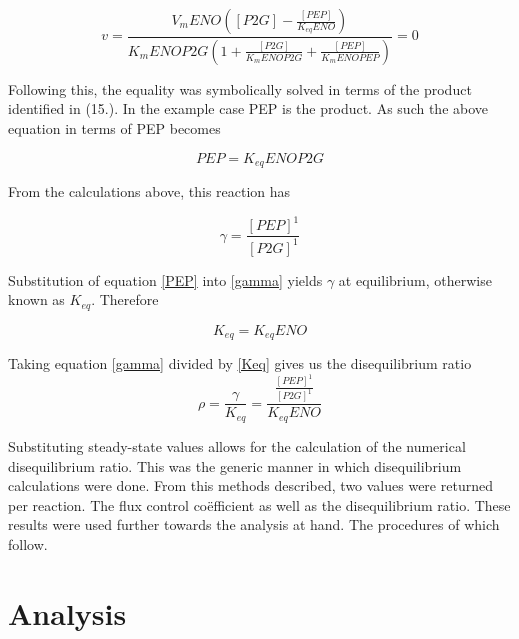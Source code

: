 \begin{equation}
v = \frac{V_mENO([P2G] - \frac{[PEP]}{K_{eq}ENO})}{K_mENOP2G(1 + \frac{[P2G]}{K_mENOP2G} + \frac{[PEP]}{K_mENOPEP})} = 0
\end{equation}

Following this, the equality was symbolically solved in terms of the product identified in (15.). In the example case PEP is the product. As such the above equation in terms of PEP becomes

\begin{equation}\label{PEP}
PEP = K_{eq}ENOP2G
\end{equation}

From the calculations above, this reaction has

\begin{equation}\label{gamma}
\gamma=\frac{[PEP]^1}{[P2G]^1}
\end{equation}

Substitution of equation \ref{PEP} into \ref{gamma} yields $\gamma$ at equilibrium, otherwise known as $K_{eq}$. Therefore

\begin{equation}\label{Keq}
K_{eq}=K_{eq}ENO
\end{equation}

Taking equation \ref{gamma} divided by \ref{Keq} gives us the disequilibrium ratio
\begin{equation}
\rho = \frac{\gamma}{K_{eq}} = \frac{\frac{[PEP]^1}{[P2G]^1}}{K_{eq}ENO}
\end{equation}

Substituting steady-state values allows for the calculation of the numerical disequilibrium ratio. This was the generic manner in which disequilibrium calculations were done. From this methods described, two values were returned per reaction. The flux control co\"efficient as well as the disequilibrium ratio. These results were used further towards the analysis at hand. The procedures of which follow.

\section{Analysis} \label{Analysis}
